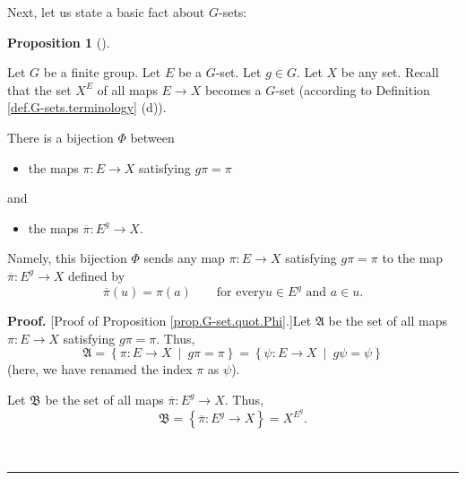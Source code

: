 \documentclass[numbers=enddot,12pt,final,onecolumn,notitlepage,abstracton]{scrartcl}
\theoremstyle{definition}
\newtheorem{prop}[theo]{Proposition}
\newenvironment{proposition}[1][]
{\begin{prop}[#1]\begin{leftbar}}
{\end{leftbar}\end{prop}}
\newenvironment{proof}[1][Proof]{\noindent\textbf{#1.} }{\ \rule{0.5em}{0.5em}}
\newenvironment{verlong}{}{}
\begin{document}
\begin{verlong}
Next, let us state a basic fact about $G$-sets:

\begin{proposition}
\label{prop.G-set.quot.Phi}Let $G$ be a finite group. Let $E$ be a $G$-set.
Let $g \in G$.
Let $X$ be any set. Recall that the set $X^{E}$ of all maps $E\rightarrow X$
becomes a $G$-set (according to Definition \ref{def.G-sets.terminology} (d)).

There is a bijection $\Phi$ between

\begin{itemize}
\item the maps $\pi:E\rightarrow X$ satisfying $g\pi=\pi$
\end{itemize}

and

\begin{itemize}
\item the maps $\overline{\pi}:E^{g}\rightarrow X$.
\end{itemize}

Namely, this bijection $\Phi$ sends any map $\pi:E\rightarrow X$ satisfying
$g\pi=\pi$ to the map $\overline{\pi}:E^{g}\rightarrow X$ defined by
\[
\overline{\pi}\left(  u\right)  =\pi\left(  a\right)  \qquad\text{for every
}u\in E^{g}\text{ and }a\in u.
\]

\end{proposition}

\begin{proof}
[Proof of Proposition \ref{prop.G-set.quot.Phi}.]Let $\mathfrak{A}$ be the set
of all maps $\pi:E\rightarrow X$ satisfying $g\pi=\pi$. Thus,%
\[
\mathfrak{A}=\left\{  \pi:E\rightarrow X\ \mid\ g\pi=\pi\right\}  =\left\{
\psi:E\rightarrow X\ \mid\ g\psi=\psi\right\}
\]
(here, we have renamed the index $\pi$ as $\psi$).

Let $\mathfrak{B}$ be the set of all maps $\overline{\pi}:E^{g}\rightarrow X$.
Thus,%
\[
\mathfrak{B}=\left\{  \overline{\pi}:E^{g}\rightarrow X\right\}  =X^{E^{g}}.
\]



\end{proof}
\end{verlong}
\end{document}
